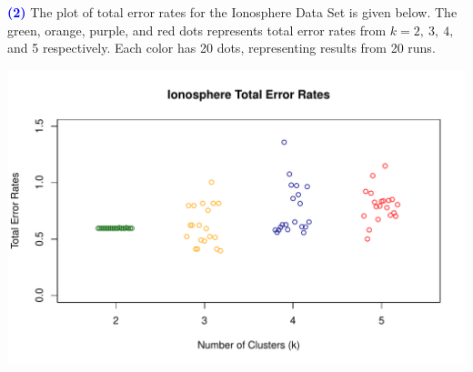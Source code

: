 \documentclass[a4paper,11pt]{article}
\newcommand{\qnum}[1]{\noindent\textcolor{blue}{\textbf{(#1)}}}
\begin{document}
\qnum{2}
The plot of total error rates for the Ionosphere Data Set is given below.
The green, orange, purple, and red dots represents total error rates from $k = 2,\ 3,\ 4, $ and 5 respectively. Each color has 20 dots, representing results from 20 runs.

\begin{center}
  \includegraphics[width=0.9\linewidth]{Image/Prob4-iono.pdf}
\end{center}
\end{document}
